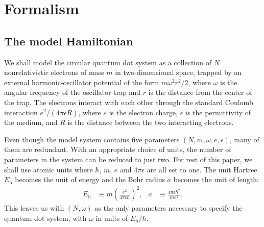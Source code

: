 \section{Formalism}
\label{sec:formalism}

\subsection{The model Hamiltonian}
\label{subsec:modelHamiltonian}

We shall model the circular quantum dot system as a collection of $N$ nonrelativistic electrons of mass $m$ in two-dimensional space, trapped by an external harmonic-oscillator potential of the form $m \omega^2r^2 / 2$, where $\omega$ is the angular frequency of the oscillator trap and $r$ is the distance from the center of the trap.  The electrons interact with each other through the standard Coulomb interaction $e^2 / (4 \pi \epsilon R)$, where $e$ is the electron charge, $\epsilon$ is the permittivity of the medium, and $R$ is the distance between the two interacting electrons.

Even though the model system contains five parameters $(N, m, \omega, e, \epsilon)$, many of them are redundant.  With an appropriate choice of units, the number of parameters in the system can be reduced to just two.  For rest of this paper, we shall use atomic units where $\hbar$, $m$, $e$ and $4 \pi \epsilon$ are all set to one.  The unit Hartree $E_{\mathrm{h}}$ becomes the unit of energy and the Bohr radius $a$ becomes the unit of length:
\begin{align*}
  E_{\mathrm{h}} &\equiv m \left(\frac{e^2}{4 \pi \epsilon \hbar}\right)^2, &
  a &\equiv \frac{4 \pi \epsilon \hbar^2}{m e^2}.
\end{align*}
This leaves us with $(N, \omega)$ as the only parameters necessary to specify the quantum dot system, with $\omega$ in units of $E_{\mathrm{h}} / \hbar$.

